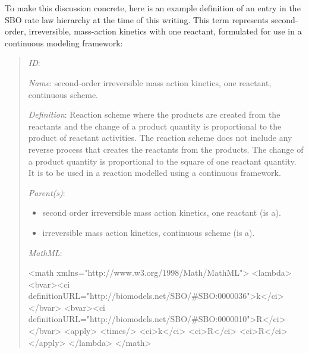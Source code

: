 To make this discussion concrete, here is an example definition of
an entry in the SBO rate law hierarchy at the time of this
writing.  This term represents second-order, irreversible,
mass-action kinetics with one reactant, formulated for use in a
continuous modeling framework:
\begin{quote}
\begin{description}

\item \emph{ID}: 

\item \emph{Name}: second-order irreversible mass action kinetics,
  one reactant, continuous scheme.

\item \emph{Definition}: Reaction scheme where the products are
  created from the reactants and the change of a product quantity
  is proportional to the product of reactant activities. The
  reaction scheme does not include any reverse process that
  creates the reactants from the products. The change of a product
  quantity is proportional to the square of one reactant quantity.
  It is to be used in a reaction modelled using a continuous
  framework.

\begin{blockChanged}

\item \emph{Parent(s)}: 
  \begin{itemize}
  \item {} second order irreversible mass action
    kinetics, one reactant (is a).
  \item {}
    irreversible mass action kinetics, continuous scheme (is a).
  \end{itemize}
  
\end{blockChanged}

\item \emph{MathML}:
\begin{example}
<math xmlns="http://www.w3.org/1998/Math/MathML">
      <lambda>
         <bvar><ci definitionURL="http://biomodels.net/SBO/#SBO:0000036">k</ci></bvar>
         <bvar><ci definitionURL="http://biomodels.net/SBO/#SBO:0000010">R</ci></bvar>
         <apply>
            <times/>
            <ci>k</ci>
            <ci>R</ci>
            <ci>R</ci>
         </apply>
      </lambda>
</math>
\end{example}

\end{description}
\end{quote}

